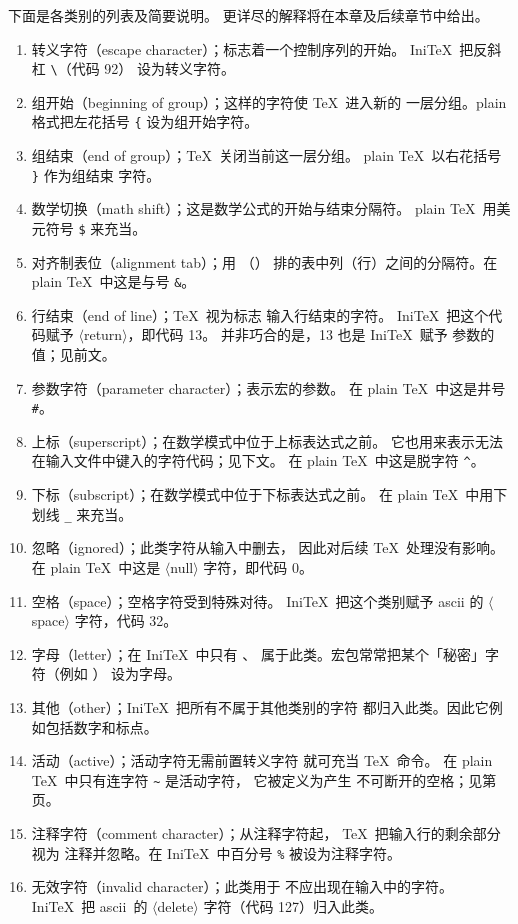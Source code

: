 \documentclass[a4paper]{rapport3}
\def\gr#1{$\langle$#1$\rangle$}\def\key#1{{\tt#1}}
\def\ascii{{\sc ascii}}
\def\IniTeX{Ini\TeX}\def\LamsTeX{LAMS\TeX}\def\VirTeX{Vir\TeX}
\def\gram#1{\gr{#1}}%
\begin{document}
下面是各类别的列表及简要说明。
更详尽的解释将在本章及后续章节中给出。
\begin{enumerate} %
\setcounter{enumi}{-1}
\item\label{ini:esc} 转义字符（escape character）；标志着一个控制序列的开始。
      \IniTeX\ 把反斜杠 \verb-\-（代码 92）
      设为转义字符。
\item 组开始（beginning of group）；这样的字符使 \TeX\ 进入新的
      一层分组。plain 格式把左花括号 \verb-{-
\mdqon
      设为组开始字符。
\mdqoff
\item 组结束（end of group）；\TeX\ 关闭当前这一层分组。
      plain \TeX\ 以右花括号 \verb-}- 作为组结束
      字符。
\item 数学切换（math shift）；这是数学公式的开始与结束分隔符。
      plain \TeX\ 用美元符号 \verb-$-
      来充当。
\item 对齐制表位（alignment tab）；用 （）
      排的表中列（行）之间的分隔符。在 plain
      \TeX\ 中这是与号 \verb-&-。
\item\label{ini:eol} 行结束（end of line）；\TeX\ 视为标志
      输入行结束的字符。
      \IniTeX\ 把这个代码赋予 \gram{return}，即代码 13。
      并非巧合的是，13 也是 \IniTeX\
      赋予  参数的值；见前文。
\awp
\item 参数字符（parameter character）；表示宏的参数。
      在 plain \TeX\ 中这是井号 \verb-#-。
\item 上标（superscript）；在数学模式中位于上标表达式之前。
      它也用来表示无法
      在输入文件中键入的字符代码；见下文。
      在 plain \TeX\ 中这是脱字符 \verb-^-。
\item 下标（subscript）；在数学模式中位于下标表达式之前。
      在 plain \TeX\ 中用下划线 \verb-_- 来充当。
\item 忽略（ignored）；此类字符从输入中删去，
      因此对后续 \TeX\ 处理没有影响。
      在 plain \TeX\ 中这是
      \gr{null} 字符，即代码 0。
\item\label{ini:sp} 空格（space）；空格字符受到特殊对待。
      \IniTeX\ 把这个类别赋予 \ascii{} 的 \gr{space}
      字符，代码 32。
\item\label{ini:let} 字母（letter）；在 \IniTeX\ 中只有 、
      属于此类。宏包常常把某个「秘密」字符（例如 \n@）
      设为字母。
\item\label{ini:other} 其他（other）；\IniTeX\ 把所有不属于其他类别的字符
      都归入此类。因此它例如包括数字和标点。
\item 活动（active）；活动字符无需前置转义字符
      就可充当 \TeX\ 命令。
      在 plain \TeX\ 中只有连字符 \verb-~- 是活动字符，
      它被定义为产生
      不可断开的空格；见第~\pageref{tie} 页。
\item\label{ini:comm} 注释字符（comment character）；从注释字符起，
      \TeX\ 把输入行的剩余部分视为
      注释并忽略。在 \IniTeX\ 中百分号 \verb-%-
      被设为注释字符。
\item\label{ini:invalid} 无效字符（invalid character）；此类用于
      不应出现在输入中的字符。\IniTeX\ 把
      \ascii\ 的 \gr{delete} 字符（代码 127）归入此类。
\end{enumerate}
\end{document}
